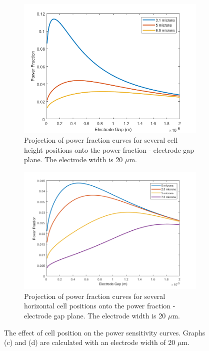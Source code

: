 \begin{figure}[t]
\begin{subfigure}[b]{0.49\textwidth}
        \label{fig:horizontal_cell_position_sensitivty}
    \end{subfigure}
    \\
    \vspace{0.1 in}
    \begin{subfigure}[b]{0.49\textwidth}
        \centering
        \includegraphics[width=\textwidth]{images/analytic_vertical_power_width20.png}
        \caption{Projection of power fraction curves for several cell height positions onto the power fraction - electrode gap plane. The electrode width is 20 $\mu$m.}
    \end{subfigure}
    \hfill
    \begin{subfigure}[b]{0.49\textwidth}
        \centering
        \includegraphics[width=\textwidth]{images/analytic_horizontal_power_20width.png}
        \caption{Projection of power fraction curves for several horizontal cell positions onto the power fraction - electrode gap plane. The electrode width is 20 $\mu$m.}
    \end{subfigure}
    \caption[The effect of cell position on the power sensitivity curves.]{The effect of cell position on the power sensitivity curves. Graphs (c) and (d) are calculated with an electrode width of 20 $\mu$m.}
    \label{fig:cell_position_sensitivity}
    \vspace{3 in}
\end{figure}

